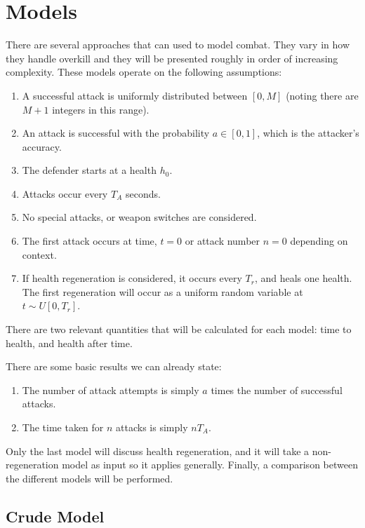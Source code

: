 \chapter{Models}
There are several approaches that can used to model combat. They vary in how they handle overkill and they will be presented roughly in order of increasing complexity. These models operate on the following assumptions:
		\begin{enumerate}
			\item A successful attack is uniformly distributed between $[0, M]$ (noting there are $M+1$ integers in this range).
			\item An attack is successful with the probability $a\in[0, 1]$, which is the attacker's accuracy.
			\item The defender starts at a health $h_0$.
			\item Attacks occur every $T_A$ seconds.
			\item No special attacks, or weapon switches are considered.
			\item The first attack occurs at time, $t=0$ or attack number $n=0$ depending on context.
			\item If health regeneration is considered, it occurs every $T_r$, and heals one health.
					The first regeneration will occur as a uniform random variable at $t\sim U[0, T_r]$.
		\end{enumerate}
		There are two relevant quantities that will be calculated for each model: time to health, and health after time.

		There are some basic results we can already state:
		\begin{enumerate}
			\item The number of attack attempts is simply $a$ times the number of successful attacks.
			\item The time taken for $n$ attacks is simply $nT_A$.
		\end{enumerate}

		Only the last model will discuss health regeneration, and it will take a non-regeneration model as input so it applies generally.
		Finally, a comparison between the different models will be performed.

		\section{Crude Model}
